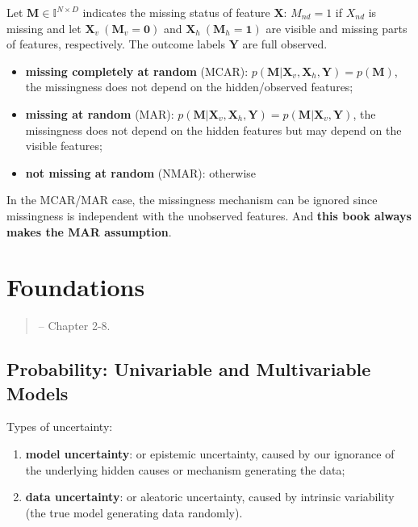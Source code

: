 Let $\bm{M}\in\mathbb{I}^{N\times{D}}$ indicates the missing status of feature $\bm{X}$:
$M_{nd}=1$ if $X_{nd}$ is missing and let $\bm{X}_v~(\bm{M}_v=\bm{0})$ and 
$\bm{X}_h~(\bm{M}_h=\bm{1})$ 
are visible and missing parts of features, respectively. 
The outcome labels $\mathbf{Y}$ are full observed.
\begin{itemize}
    \item \textbf{missing completely at random} (MCAR): 
    $p(\bm{M}|\bm{X}_v,\bm{X}_h,\bm{Y})=p(\bm{M})$,
    the missingness does not depend on the hidden/observed features;
    \item \textbf{missing at random} (MAR):
    $p(\bm{M}|\bm{X}_v,\bm{X}_h,\bm{Y})
    =p(\bm{M}|\bm{X}_v,\bm{Y})$,
    the missingness does not depend on the hidden features but may depend on the visible features;
    \item \textbf{not missing at random} (NMAR): otherwise
\end{itemize}

\begin{note}
    In the MCAR/MAR case, the missingness mechanism can be ignored since missingness is
    independent with the unobserved features. 
    And \textbf{this book always makes the MAR assumption}.
\end{note}

\section{Foundations}
\begin{quote}
    \citep{pml1Book} -- Chapter 2-8.
\end{quote}

\subsection{Probability: Univariable and Multivariable Models}

Types of uncertainty:
\begin{enumerate}
    \item \textbf{model uncertainty}: or epistemic uncertainty,
    caused by our ignorance of the underlying hidden causes or mechanism generating the data;
    \item \textbf{data uncertainty}: or aleatoric uncertainty,
    caused by intrinsic variability (the true model generating data randomly).
\end{enumerate}

